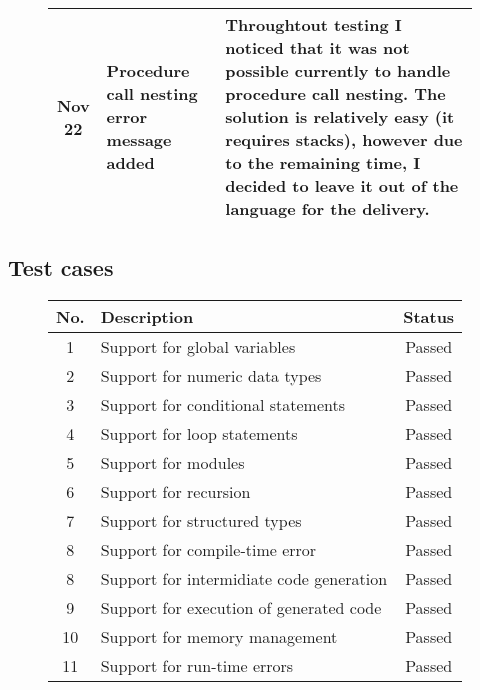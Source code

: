 \begin{figure}[H]
\begin{tabular}{cp{1.25in}p{2.5in}}
        \midrule
        Nov 22 & Procedure call \newline nesting error \newline message added &
        Throughtout testing I noticed that it was not possible currently to
        handle procedure call nesting. The solution is relatively easy
        (it requires stacks), however due to the remaining time, I decided to
        leave it out of the language for the delivery.\\

        \bottomrule
    \end{tabular}
\end{figure}

\newpage

\subsection{Test cases}

\begin{figure}[H]
    \centering
    \begin{tabular}{cp{2.5in}c}
        \toprule
        \textbf{No.} & \textbf{Description} & \textbf{Status}\\
        \midrule  1 & Support for global variables & Passed \\
        \midrule  2 & Support for numeric data types & Passed \\
        \midrule  3 & Support for conditional statements & Passed \\
        \midrule  4 & Support for loop statements & Passed \\
        \midrule  5 & Support for modules & Passed \\
        \midrule  6 & Support for recursion & Passed \\
        \midrule  7 & Support for structured types & Passed \\
        \midrule  8 & Support for compile-time error & Passed \\
        \midrule  8 & Support for intermidiate code generation & Passed \\
        \midrule  9 & Support for execution of generated code & Passed \\
        \midrule 10 & Support for memory management & Passed \\
        \midrule 11 & Support for run-time errors & Passed \\
        \bottomrule
    \end{tabular}
\end{figure}
